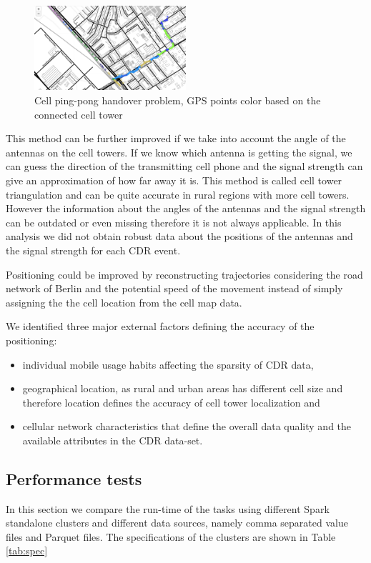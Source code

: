 \begin{figure}[h]
    \centering
    \includegraphics[width=0.5\textwidth]{images/ping-pong.png}
    \caption{Cell ping-pong handover problem, GPS points color based on the connected cell tower}
    \label{fig:ping-pong}
\end{figure}

This method can be further improved if we take into account the angle of the antennas on the cell towers. If we know which antenna is getting the signal, we can guess the direction of the transmitting cell phone and the signal strength can give an approximation of how far away it is. This method is called cell tower triangulation and can be quite accurate in rural regions with more cell towers. However the information about the angles of the antennas and the signal strength can be outdated or even missing therefore it is not always applicable. In this analysis we did not obtain robust data about the positions of the antennas and the signal strength for each CDR event.

Positioning could be improved by reconstructing trajectories considering the road network of Berlin and the potential speed of the movement instead of simply assigning the the cell location from the cell map data.

We identified three major external factors defining the accuracy of the positioning:
\begin{itemize}
    \item individual mobile usage habits affecting the sparsity of CDR data,
    \item geographical location, as rural and urban areas has different cell size and therefore location defines the accuracy of cell tower localization and
    \item cellular network characteristics that define the overall data quality and the available attributes in the CDR data-set.
\end{itemize}


\subsection{Performance tests}
In this section we compare the run-time of the tasks using different Spark standalone clusters and different data sources, namely comma separated value files and Parquet files. The specifications of the clusters are shown in Table \ref{tab:spec}

